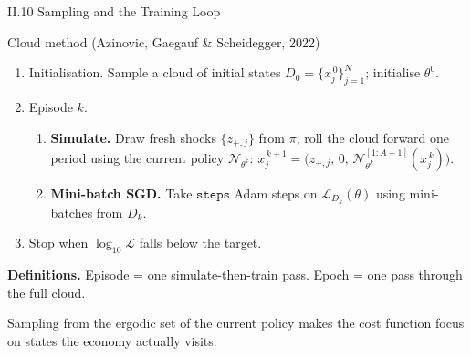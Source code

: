 \documentclass[aspectratio=169,11pt]{beamer}
\newcommand{\emphc}[1]{\textcolor{harvardcrimson}{#1}}
\newcommand{\N}{\mathcal{N}}
\newcommand{\Loss}{\mathcal{L}}
\begin{document}
\begin{frame}{II.10 Sampling and the Training Loop}
\small
\begin{block}{Cloud method (Azinovic, Gaegauf \& Scheidegger, 2022)}
\vspace{-2pt}
\begin{enumerate}\itemsep2pt
    \item \emphc{Initialisation.}  Sample a cloud of initial states $D_0 = \{x_j^{\,0}\}_{j=1}^{N}$; initialise $\theta^0$.
    \item \emphc{Episode $k$.}
    \begin{enumerate}
        \item[(a)] \textbf{Simulate.}  Draw fresh shocks $\{z_{+,j}\}$ from $\pi$; roll the cloud forward one period using the \emphc{current} policy $\N_{\theta^k}$:
        $x_j^{\,k+1} = \bigl(z_{+,j},\,0,\,\N_{\theta^k}^{[1:A-1]}(x_j^{\,k})\bigr)$.
        \item[(b)] \textbf{Mini-batch SGD.}  Take $\texttt{steps}$ Adam steps on $\Loss_{D_k}(\theta)$ using mini-batches from $D_k$.
    \end{enumerate}
    \item \emphc{Stop} when $\log_{10} \Loss$ falls below the target.
\end{enumerate}
\end{block}

\vspace{0.2em}
\textbf{Definitions.}  \emphc{Episode} = one simulate-then-train pass.  \emphc{Epoch} = one pass through the full cloud.

\vspace{0.3em}
{\footnotesize Sampling from the ergodic set of the current policy makes the cost function focus on states the economy actually visits.}
\end{frame}
\end{document}
